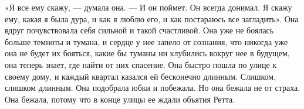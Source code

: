 «Я все ему скажу, — думала она. — И он поймет. Он всегда донимал. Я скажу ему, какая я была дура, и как я люблю его, и как постараюсь все загладить». Она вдруг почувствовала себя сильной и такой счастливой. Она уже не боялась больше темноты и тумана, и сердце у нее запело от сознания, что никогда уже она не будет их бояться, какие бы туманы ни клубились вокруг нее в будущем, она теперь знает, где найти от них спасение. Она быстро пошла по улице к своему дому, и каждый квартал казался ей бесконечно длинным. Слишком, слишком длинным. Она подобрала юбки и побежала. Но она бежала не от страха. Она бежала, потому что в конце улицы ее ждали объятия Ретта.

